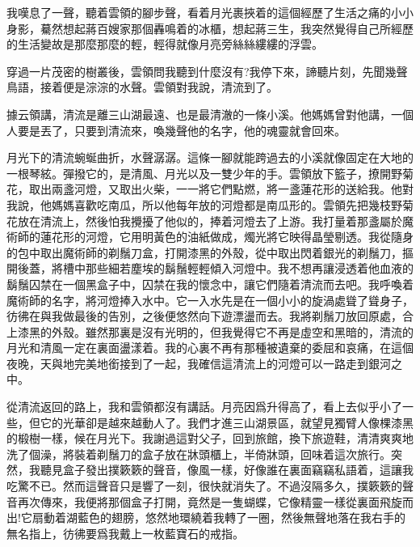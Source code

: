 \documentclass[a6paper]{article}
\begin{document}
我嘆息了一聲，聽着雲領的腳步聲，看着月光裹挾着的這個經歷了生活之痛的小小身影，驀然想起蔣百嫂家那個轟鳴着的冰櫃，想起蔣三生，我突然覺得自己所經歷的生活變故是那麼那麼的輕，輕得就像月亮旁絲絲縷縷的浮雲。

穿過一片茂密的樹叢後，雲領問我聽到什麼沒有?我停下來，諦聽片刻，先聞幾聲鳥語，接着便是淙淙的水聲。雲領對我說，清流到了。

據云領講，清流是離三山湖最遠、也是最清澈的一條小溪。他媽媽曾對他講，一個人要是丟了，只要到清流來，喚幾聲他的名字，他的魂靈就會回來。

月光下的清流蜿蜒曲折，水聲潺潺。這條一腳就能跨過去的小溪就像固定在大地的一根琴絃。彈撥它的，是清風、月光以及一雙少年的手。雲領放下籃子，撩開野菊花，取出兩盞河燈，又取出火柴，一一將它們點燃，將一盞蓮花形的送給我。他對我說，他媽媽喜歡吃南瓜，所以他每年放的河燈都是南瓜形的。雲領先把幾枝野菊花放在清流上，然後怕我攪擾了他似的，捧着河燈去了上游。我打量着那盞屬於魔術師的蓮花形的河燈，它用明黃色的油紙做成，燭光將它映得晶瑩剔透。我從隨身的包中取出魔術師的剃鬚刀盒，打開漆黑的外殼，從中取出閃着銀光的剃鬚刀，摳開後蓋，將槽中那些細若塵埃的鬍鬚輕輕傾入河燈中。我不想再讓浸透着他血液的鬍鬚囚禁在一個黑盒子中，囚禁在我的懷念中，讓它們隨着清流而去吧。我呼喚着魔術師的名字，將河燈捧入水中。它一入水先是在一個小小的旋渦處聳了聳身子，彷彿在與我做最後的告別，之後便悠然向下遊漂盪而去。我將剃鬚刀放回原處，合上漆黑的外殼。雖然那裏是沒有光明的，但我覺得它不再是虛空和黑暗的，清流的月光和清風一定在裏面盪漾着。我的心裏不再有那種被遺棄的委屈和哀痛，在這個夜晚，天與地完美地銜接到了一起，我確信這清流上的河燈可以一路走到銀河之中。

從清流返回的路上，我和雲領都沒有講話。月亮因爲升得高了，看上去似乎小了一些，但它的光華卻是越來越動人了。我們才進三山湖景區，就望見獨臂人像棵漆黑的椴樹一樣，候在月光下。我謝過這對父子，回到旅館，換下旅遊鞋，清清爽爽地洗了個澡，將裝着剃鬚刀的盒子放在牀頭櫃上，半倚牀頭，回味着這次旅行。突然，我聽見盒子發出撲簌簌的聲音，像風一樣，好像誰在裏面竊竊私語着，這讓我吃驚不已。然而這聲音只是響了一刻，很快就消失了。不過沒隔多久，撲簌簌的聲音再次傳來，我便將那個盒子打開，竟然是一隻蝴蝶，它像精靈一樣從裏面飛旋而出!它扇動着湖藍色的翅膀，悠然地環繞着我轉了一圈，然後無聲地落在我右手的無名指上，彷彿要爲我戴上一枚藍寶石的戒指。
\end{document}
